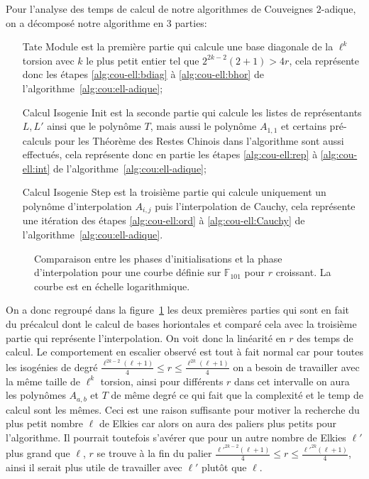 \documentclass[10pt,a4paper]{book}
\theoremstyle{plain}
\theoremstyle{definition}
\theoremstyle{definition}
\theoremstyle{definition}
\theoremstyle{definition}
\theoremstyle{remark}
\theoremstyle{remark}
\theoremstyle{definition}
\begin{document}
Pour l'analyse des temps de calcul de notre algorithmes de Couveignes 
$2$-adique, on a décomposé notre algorithme en 3 parties:
\begin{enumerate}
\item[Tate Module] est la première partie qui calcule une base diagonale de la 
$\ell^k$ torsion avec $k$ le plus petit entier tel que $2^{2k-2}(2+1)> 4r$,
cela représente donc les étapes \ref{alg:cou-ell:bdiag} à \ref{alg:cou-ell:bhor} de l'algorithme~\ref{alg:cou:ell-adique};
\item[Calcul Isogenie Init] est la seconde partie qui calcule les listes de 
représentants $L,L'$ ainsi que le polynôme $T$, mais aussi le polynôme 
$A_{1,1}$ et certains pré-calculs pour les Théorème des Restes Chinois dans 
l'algorithme sont aussi effectués, cela représente donc en partie les étapes 
\ref{alg:cou-ell:rep} à \ref{alg:cou-ell:int} de 
l'algorithme~\ref{alg:cou:ell-adique};
\item[Calcul Isogenie Step] est la troisième partie qui calcule uniquement 
un polynôme d'interpolation $A_{i,j}$ puis l'interpolation de 
Cauchy, cela représente une itération des étapes \ref{alg:cou-ell:ord} à 
\ref{alg:cou-ell:Cauchy} de l'algorithme~\ref{alg:cou:ell-adique}.
\end{enumerate}


\begin{figure}
\label{fig:exp:uni}
\caption{Comparaison entre les phases d'initialisations et la phase d'interpolation pour une courbe définie sur $\mathbb{F}_{101}$ pour $r$ croissant. La courbe est en échelle logarithmique.}
\end{figure}


On a donc regroupé dans la figure~\ref{fig:exp:uni} les deux premières parties
qui sont en fait du précalcul dont le calcul de bases horiontales et comparé 
cela avec la troisième partie qui représente l'interpolation. On voit donc la 
linéarité en $r$ des temps de calcul. 
Le comportement en escalier observé est tout à fait normal car pour toutes les 
isogénies de degré 
$\frac{\ell^{2k-2}(\ell+1)}{4} \leqslant r \leqslant \frac{\ell^{2k}(\ell+1)}{4}$ 
on a besoin de travailler avec la même taille de $\ell^{k}$ torsion, ainsi pour 
différents $r$ dans cet intervalle on aura les polynômes $A_{a,b}$ et $T$ de 
même degré ce qui fait que la complexité et le temp de calcul sont les mêmes. 
Ceci est une raison 
suffisante pour motiver la recherche du plus petit nombre $\ell$ de Elkies car
alors on aura des paliers plus petits pour l'algorithme. Il pourrait toutefois 
s'avérer que pour un autre nombre de Elkies $\ell'$ plus grand que $\ell$, $r$ 
se trouve à la fin du palier $\frac{\ell'^{2k-2}(\ell+1)}{4} \leqslant r 
\leqslant \frac{\ell'^{2k}(\ell+1)}{4}$, ainsi il serait plus utile de 
travailler avec $\ell'$ plutôt que $\ell$.
\end{document}
